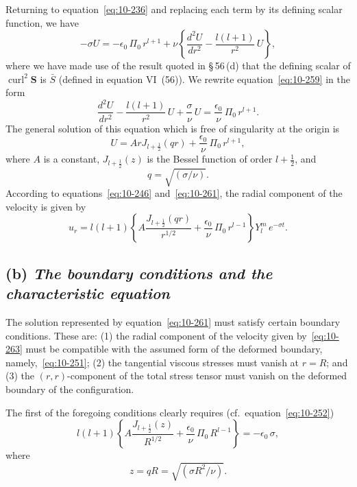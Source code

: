 Returning to equation~\eqref{eq:10-236} and replacing each term by its defining scalar function, we have
\begin{equation}
\label{eq:10-259}
-\sigma U = -\epsilon_0\,\Pi_0\,r^{l+1}+\nu\!\left\{\frac{d^2U}{dr^2}-\frac{l(l+1)}{r^2}\,U\right\}\!,
\end{equation}
where we have made use of the result quoted in \S\,56\,(d) that the defining scalar of $\operatorname{curl}^2\mathbf{S}$ is $\bar{S}$ (defined in equation VI~(56)). We rewrite equation~\eqref{eq:10-259} in the form
\begin{equation}
\label{eq:10-260}
\frac{d^2U}{dr^2}-\frac{l(l+1)}{r^2}\,U+\frac{\sigma}{\nu}\,U = \frac{\epsilon_0}{\nu}\,\Pi_0\,r^{l+1}.
\end{equation}
The general solution of this equation which is free of singularity at the origin is
\begin{equation}
\label{eq:10-261}
U = Ar J_{l+\frac{1}{2}}(qr)+\frac{\epsilon_0}{\nu}\,\Pi_0\,r^{l+1},
\end{equation}
where $A$ is a constant, $J_{l+\frac{1}{2}}(z)$ is the Bessel function of order $l+\frac{1}{2}$, and
\begin{equation}
\label{eq:10-262}
q = \sqrt{(\sigma/\nu)}.
\end{equation}
According to equations~\eqref{eq:10-246} and~\eqref{eq:10-261}, the radial component of the velocity is given by
\begin{equation}
\label{eq:10-263}
u_r = l(l+1)\!\left\{A\frac{J_{l+\frac{1}{2}}(qr)}{r^{1/2}}+\frac{\epsilon_0}{\nu}\,\Pi_0\,r^{l-1}\right\}\!Y_l^m\,e^{-\sigma t}.
\end{equation}

\subsection*{(b) \textit{The boundary conditions and the characteristic equation}}

The solution represented by equation~\eqref{eq:10-261} must satisfy certain boundary conditions. These are: (1) the radial component of the velocity given by~\eqref{eq:10-263} must be compatible with the assumed form of the deformed boundary, namely,~\eqref{eq:10-251}; (2) the tangential viscous stresses must vanish at $r = R$; and (3) the $(r,r)$-component of the total stress tensor must vanish on the deformed boundary of the configuration.

The first of the foregoing conditions clearly requires (cf.\ equation~\eqref{eq:10-252})
\begin{equation}
\label{eq:10-264}
l(l+1)\!\left\{A\frac{J_{l+\frac{1}{2}}(z)}{R^{1/2}}+\frac{\epsilon_0}{\nu}\,\Pi_0\,R^{l-1}\right\} = -\epsilon_0\,\sigma,
\end{equation}
where
\begin{equation}
\label{eq:10-265}
z = qR = \sqrt{(\sigma R^2/\nu)}.
\end{equation}

